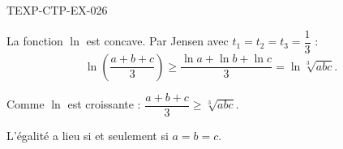 \begin{corrige}{TEXP-CTP-EX-026}

La fonction $\ln$ est concave. Par Jensen avec $t_1=t_2=t_3=\dfrac{1}{3}$ :
\[ \ln\!\left(\frac{a+b+c}{3}\right) \geq \frac{\ln a + \ln b + \ln c}{3} = \ln\sqrt[3]{abc}. \]


Comme $\ln$ est croissante : $\dfrac{a+b+c}{3} \geq \sqrt[3]{abc}$.

L'égalité a lieu si et seulement si $a = b = c$.

\end{corrige}
